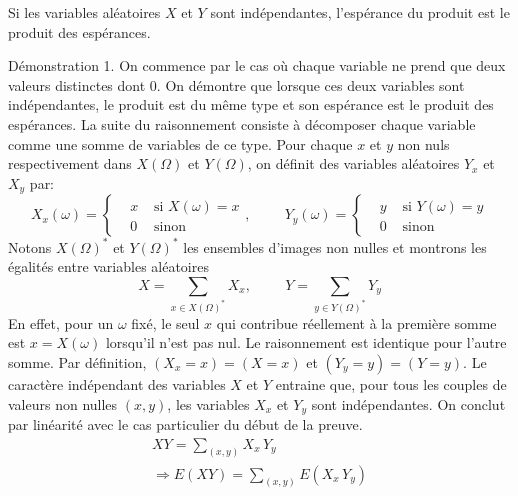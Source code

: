 \clearpage
\begin{prop}
 Si les variables aléatoires $X$ et $Y$ sont indépendantes, l'espérance du produit est le produit des espérances.
\end{prop}
\begin{demo}
Démonstration 1.\newline
 On commence par le cas où chaque variable ne prend que deux valeurs distinctes dont $0$. On démontre que lorsque ces deux variables sont indépendantes, le produit est du même type et son espérance est le produit des espérances.\newline
La suite du raisonnement consiste à décomposer chaque variable comme une somme de variables de ce type.\newline
Pour chaque $x$ et $y$ non nuls respectivement dans $X(\Omega)$ et $Y(\Omega)$, on définit des variables aléatoires $Y_x$ et $X_y$ par:
\begin{displaymath}
 X_x(\omega)=
\left\lbrace 
\begin{aligned}
 &x &\text{ si }X(\omega)=x \\ &0 &\text{ sinon}
\end{aligned}
\right.
,\hspace{1cm}
Y_y(\omega)=
\left\lbrace 
\begin{aligned}
 &y &\text{ si }Y(\omega)=y \\ &0 &\text{ sinon}
\end{aligned}
\right. 
\end{displaymath}
Notons $X(\Omega)^*$ et $Y(\Omega)^*$ les ensembles d'images non nulles et montrons les égalités entre variables aléatoires
\begin{displaymath}
 X = \sum_{x\in X(\Omega)^*}X_x ,\hspace{1cm} Y = \sum_{y\in Y(\Omega)^*}Y_y 
\end{displaymath}
En effet, pour un $\omega$ fixé, le seul $x$ qui contribue réellement à la première somme est $x=X(\omega)$ lorsqu'il n'est pas nul. Le raisonnement est identique pour l'autre somme.\newline
Par définition, $(X_x=x) = (X=x)$ et $(Y_y=y) = (Y=y)$. Le caractère indépendant des variables $X$ et $Y$ entraine que, pour tous les couples de valeurs non nulles $(x,y)$, les variables $X_x$ et $Y_y$ sont indépendantes. On conclut par linéarité avec le cas particulier du début de la preuve.
\begin{multline*}
 XY = \sum_{(x,y)}X_x\,Y_y \\\Rightarrow
E(XY) = \sum_{(x,y)}E(X_x\,Y_y)

\end{multline*}
\end{demo}
